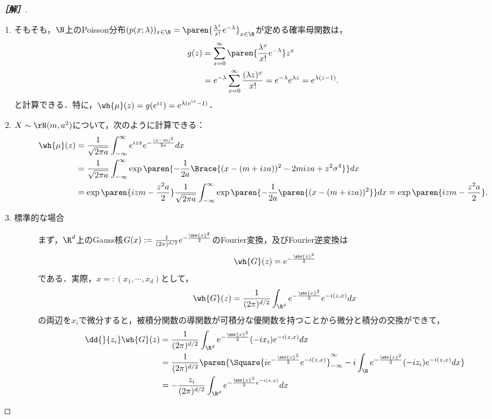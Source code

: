\documentclass[uplatex,dvipdfmx]{jsarticle}
\begin{document}
\begin{proof}[\bf［解］]\mbox{}
    \begin{enumerate}
        \item そもそも，$\N$上のPoisson分布$(p(x;\lambda))_{x\in\N}=\paren{\frac{\lambda^x}{x!}e^{-\lambda}}_{x\in\N}$が定める確率母関数は，
        \begin{align*}
            g(z)&=\sum_{x=0}^\infty \paren{\frac{\lambda^x}{x!}e^{-\lambda}}z^x\\
            &=e^{-\lambda}\sum_{x=0}^\infty\frac{(\lambda z)^x}{x!}=e^{-\lambda}e^{\lambda z}=e^{\lambda(z-1)}.
        \end{align*}
        と計算できる．特に，$\wh{\mu}(z)=g(e^{iz})=e^{\lambda(e^{iz}-1)}$．
        \item $X\sim\rN(m,a^2)$について，次のように計算できる：
        \begin{align*}
            \wh{\mu}(z)&=\frac{1}{\sqrt{2\pi a}}\int^\infty_{-\infty}e^{izx}e^{-\frac{(x-m)^2}{2a}}dx\\
            &=\frac{1}{\sqrt{2\pi a}}\int^\infty_{-\infty}\exp\paren{-\frac{1}{2a}\Brace{(x-(m+iza))^2-2m iza+z^2\sigma^4}}dx\\
            &=\exp\paren{izm-\frac{z^2a}{2}}\frac{1}{\sqrt{2\pi a}}\int^\infty_{-\infty}\exp\paren{-\frac{1}{2a}\paren{(x-(m+iza))^2}}dx=\exp\paren{izm-\frac{z^2a}{2}}.
        \end{align*}
        \item \mbox{}
        \begin{description}
            \item[標準的な場合] まず，$\R^d$上のGauss核$G(x):=\frac{1}{(2\pi)^{d/2}}e^{-\frac{\abs{x}^2}{2}}$のFourier変換，及びFourier逆変換は
            \[\wh{G}(z)=e^{-\frac{\abs{z}^2}{2}}\]
            である．実際，$x=:(x_1,\cdots,x_d)$として，
            \[\wh{G}(z)=\frac{1}{(2\pi)^{d/2}}\int_{\R^d} e^{-\frac{\abs{x}^2}{2}}e^{-i(z,x)}dx\]
            の両辺を$x_i$で微分すると，被積分関数の導関数が可積分な優関数を持つことから微分と積分の交換ができて，
            \begin{align*}
                \dd{}{z_i}\wh{G}(z)&=\frac{1}{(2\pi)^{d/2}}\int_{\R^d} e^{-\frac{\abs{x}^2}{2}}(-ix_i)e^{-i(z,x)}dx\\
                &=\frac{1}{(2\pi)^{d/2}}\paren{\Square{ie^{-\frac{\abs{x}^2}{2}}e^{-i(z,x)}}^\infty_{-\infty}-i\int_\R e^{-\frac{\abs{x}^2}{2}}(-iz_i)e^{-i(z,x)}dx}\\
                &=-\frac{z_i}{(2\pi)^{d/2}}\int_{\R^d}e^{-\frac{\abs{x}^2}{2}e^{-i(z,x)}}dx\\

\end{align*}
\end{description}
\end{enumerate}
\end{proof}
\end{document}
